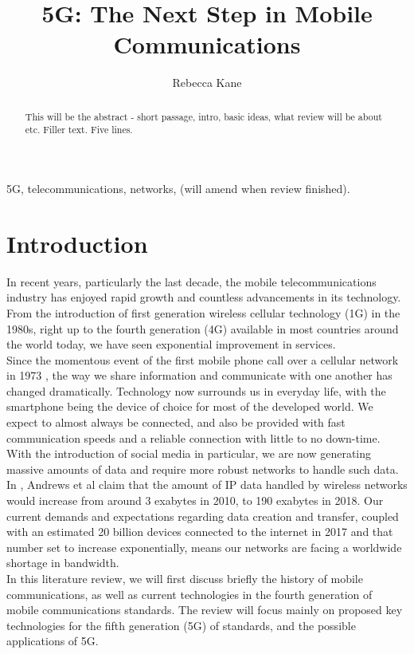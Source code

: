 \documentclass[journal]{IEEEtran}
\begin{document}
\title{5G: The Next Step in Mobile Communications}
\author{Rebecca Kane}


\maketitle

\begin{abstract}
This will be the abstract - short passage, intro, basic ideas, what review will be about etc. Filler text. Five lines.
\end{abstract}
\begin{IEEEkeywords}
5G, telecommunications, networks, (will amend when review finished).
\end{IEEEkeywords}

\section{Introduction}
In recent years, particularly the last decade, the mobile telecommunications industry has enjoyed rapid growth and countless advancements in its technology. From the introduction of first generation wireless cellular technology (1G) in the 1980s, right up to the fourth generation (4G) available in most countries around the world today, we have seen exponential improvement in services.\\
Since the momentous event of the first mobile phone call over a cellular network in 1973 \cite{tomfarhist}, the way we share information and communicate with one another has changed dramatically. Technology now surrounds us in everyday life, with the smartphone being the device of choice for most of the developed world. We expect to almost always be connected, and also be provided with fast communication speeds and a reliable connection with little to no down-time. With the introduction of social media in particular, we are now generating massive amounts of data and require more robust networks to handle such data. In \cite{whatwill5gbe}, Andrews et al claim that the amount of IP data handled by wireless networks would increase from around 3 exabytes in 2010, to 190 exabytes in 2018. Our current demands and expectations regarding data creation and transfer, coupled with an estimated 20 billion devices connected to the internet in 2017 \cite{ihsmarkit} and that number set to increase exponentially, means our networks are facing a worldwide shortage in bandwidth.\\
In this literature review, we will first discuss briefly the history of mobile communications, as well as current technologies in the fourth generation of mobile communications standards. The review will focus mainly on proposed key technologies for the fifth generation (5G) of standards, and the possible applications of 5G.
\end{document}
